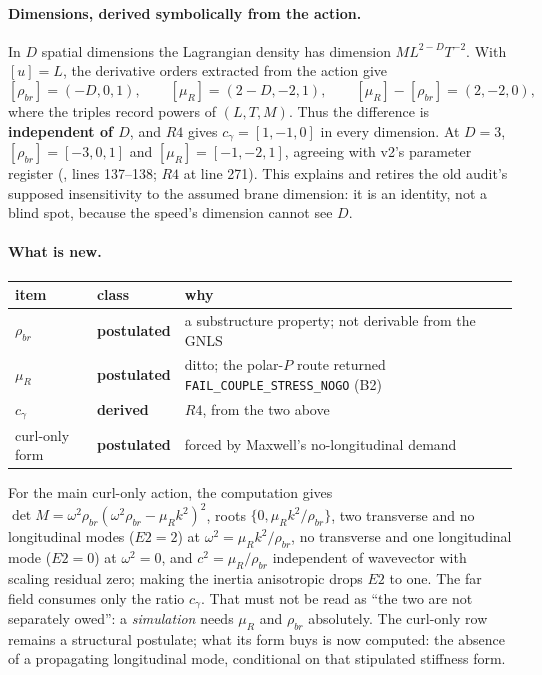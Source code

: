 \paragraph{Dimensions, derived symbolically from the action.}
In \(D\) spatial dimensions the Lagrangian density has dimension
\(M L^{2-D}T^{-2}\). With \([u]=L\), the derivative orders extracted from the
action give
\[
  [\rho_{br}]=(-D,0,1),
  \qquad
  [\mu_R]=(2-D,-2,1),
  \qquad
  [\mu_R]-[\rho_{br}]=(2,-2,0),
\]
where the triples record powers of \((L,T,M)\). Thus the difference is
\textbf{independent of \(D\)}, and \(R4\) gives \(c_\gamma=[1,-1,0]\) in every
dimension. At \(D=3\), \([\rho_{br}]=[-3,0,1]\) and
\([\mu_R]=[-1,-2,1]\), agreeing with v2's parameter register
(, lines
137--138; \(R4\) at line 271). This explains and
retires the old audit's supposed insensitivity to the assumed brane dimension:
it is an identity, not a blind spot, because the speed's dimension cannot see
\(D\).

\paragraph{What is new.}
\begin{center}
\begin{tabular}{@{}lll@{}}
\toprule
item & class & why \\
\midrule
\(\rho_{br}\) & \textbf{postulated} & a substructure property; not derivable from the GNLS \\
\(\mu_R\)     & \textbf{postulated} & ditto; the polar-\(P\) route returned \texttt{FAIL\_COUPLE\_STRESS\_NOGO} (B2) \\
\(c_\gamma\)  & \textbf{derived}    & \(R4\), from the two above \\
curl-only form & \textbf{postulated} & forced by Maxwell's no-longitudinal demand \\
\bottomrule
\end{tabular}
\end{center}

\noindent
For the main curl-only action, the computation gives
\(\det M=\omega^2\rho_{br}(\omega^2\rho_{br}-\mu_Rk^2)^2\), roots
\(\{0,\mu_Rk^2/\rho_{br}\}\), two transverse and no longitudinal modes
(\(E2=2\)) at \(\omega^2=\mu_Rk^2/\rho_{br}\), no transverse and one
longitudinal mode (\(E2=0\)) at \(\omega^2=0\), and
\(c^2=\mu_R/\rho_{br}\) independent of wavevector with scaling residual zero;
making the inertia anisotropic drops \(E2\) to one.
The far field consumes only the ratio \(c_\gamma\). That must not be read as
``the two are not separately owed'': a \emph{simulation} needs \(\mu_R\) and
\(\rho_{br}\) absolutely. The curl-only row remains a structural postulate;
what its form buys is now computed: the absence of a propagating longitudinal
mode, conditional on that stipulated stiffness form.

